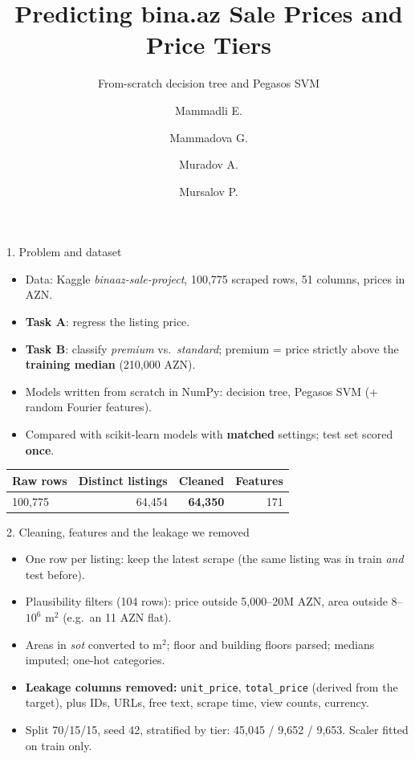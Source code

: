 \documentclass[aspectratio=169,11pt]{beamer}
\title{Predicting bina.az Sale Prices and Price Tiers}
\subtitle{From-scratch decision tree and Pegasos SVM}
\author{Mammadli E. \and Mammadova G. \and Muradov A. \and Mursalov P.}
\institute{MLE-AI-201 Machine Learning, AI Academy --- Cohort II}
\date{}
\begin{document}
\begin{frame}
  \titlepage
\end{frame}

\begin{frame}{1. Problem and dataset}
  \begin{itemize}
    \item Data: Kaggle \emph{binaaz-sale-project}, 100,775 scraped rows, 51 columns, prices in AZN.
    \item \textbf{Task A}: regress the listing price.
    \item \textbf{Task B}: classify \emph{premium} vs.\ \emph{standard}; premium = price strictly above the \textbf{training median} (210,000 AZN).
    \item Models written from scratch in NumPy: decision tree, Pegasos SVM (+ random Fourier features).
    \item Compared with scikit-learn models with \textbf{matched} settings; test set scored \textbf{once}.
  \end{itemize}
  \vspace{0.5em}
  \centering
  \begin{tabular}{lrrr}
    \toprule
    Raw rows & Distinct listings & Cleaned & Features \\
    \midrule
    100,775 & 64,454 & \textbf{64,350} & 171 \\
    \bottomrule
  \end{tabular}
\end{frame}

\begin{frame}{2. Cleaning, features and the leakage we removed}
  \begin{itemize}
    \item One row per listing: keep the latest scrape (the same listing was in train \emph{and} test before).
    \item Plausibility filters (104 rows): price outside 5,000--20M AZN, area outside 8--$10^6$ m$^2$ (e.g.\ an 11 AZN flat).
    \item Areas in \emph{sot} converted to m$^2$; floor and building floors parsed; medians imputed; one-hot categories.
    \item \textbf{Leakage columns removed:} \texttt{unit\_price}, \texttt{total\_price} (derived from the target), plus IDs, URLs, free text, scrape time, view counts, currency.
    \item Split 70/15/15, seed 42, stratified by tier: 45,045 / 9,652 / 9,653. Scaler fitted on train only.
  \end{itemize}
\end{frame}
\end{document}
